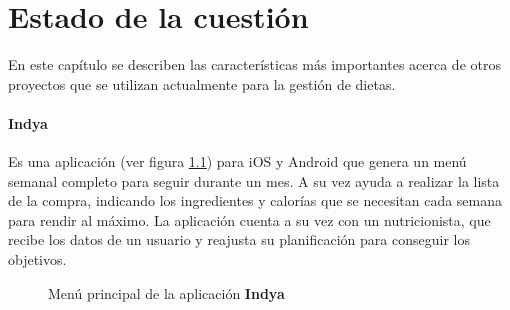 \chapter{Estado de la cuestión}
\noindent
En este capítulo se describen las características más importantes acerca de otros proyectos que se utilizan actualmente para la gestión de dietas.

\subsubsection{Indya}
Es una aplicación \cite{app_indya} (ver figura \ref{fig:indya_app}) para iOS y Android que genera un menú semanal completo para seguir durante un mes. A su vez ayuda a realizar la lista de la compra, indicando los ingredientes y calorías que se necesitan cada semana para rendir al máximo. La aplicación cuenta a su vez con un nutricionista, que recibe los datos de un usuario y reajusta su planificación para conseguir los objetivos.
\begin{figure}[H]
    \centering
    \caption{Menú principal de la aplicación \textbf{Indya}}
    \label{fig:indya_app}
\end{figure}

